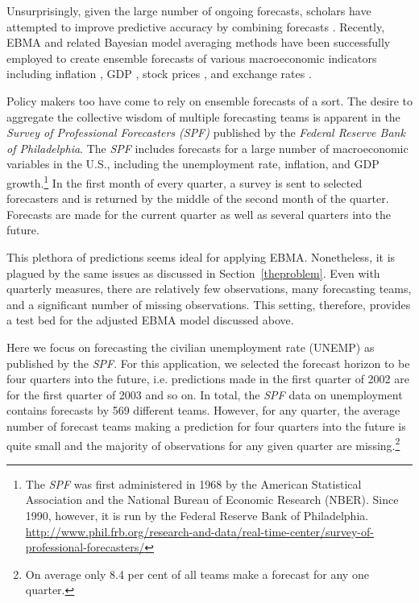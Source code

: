 \documentclass[12pt,fullpage,endnotes]{article}
\begin{document}
Unsurprisingly, given the large number of ongoing forecasts, scholars
have attempted to improve predictive accuracy by combining forecasts
\citep{Bates:1969, Palm:Zellner:1992, Elliott:Timmermann:2008}.
Recently, EBMA and related Bayesian model averaging methods have been
successfully employed to create ensemble forecasts of various
macroeconomic indicators including inflation
\citep{Koop:2010,Wright:2009}, GDP \citep{Billio:2010}, stock prices
\citep{Billio:2011}, and exchange rates \citep{Wright:2008}.

Policy makers too have come to rely on ensemble forecasts of a sort.
The desire to aggregate the collective wisdom of multiple forecasting
teams is apparent in the \textit{Survey of Professional Forecasters
  (SPF)} published by the \textit{Federal Reserve Bank of
  Philadelphia}.  The \textit{SPF} includes forecasts for a large
number of macroeconomic variables in the U.S., including the
unemployment rate, inflation, and GDP growth.\footnote{The
  \textit{SPF} was first administered in 1968 by the American
  Statistical Association and the National Bureau of Economic Research
  (NBER).  Since 1990, however, it is run by the Federal Reserve Bank
  of Philadelphia.
  \url{http://www.phil.frb.org/research-and-data/real-time-center/survey-of-professional-forecasters/}}
In the first month of every quarter, a survey is sent to selected
forecasters and is returned by the middle of the second month of the
quarter. Forecasts are made for the current quarter as well as several
quarters into the future.

This plethora of predictions seems ideal for applying EBMA.
Nonetheless, it is plagued by the same issues as discussed in
Section~\ref{theproblem}.  Even with quarterly measures, there are
relatively few observations, many forecasting teams, and a significant
number of missing observations.  This setting, therefore, provides a
test bed for the adjusted EBMA model discussed above.

Here we focus on forecasting the civilian unemployment rate (UNEMP) as
published by the \textit{SPF}. For this application, we selected the
forecast horizon to be four quarters into the future, i.e. predictions
made in the first quarter of 2002 are for the first quarter of 2003
and so on. In total, the \textit{SPF} data on unemployment contains
forecasts by 569 different teams. However, for any quarter, the
average number of forecast teams making a prediction for four quarters
into the future is quite small and the majority of observations for
any given quarter are missing.\footnote{On average only 8.4 per cent
  of all teams make a forecast for any one quarter.}
\end{document}
